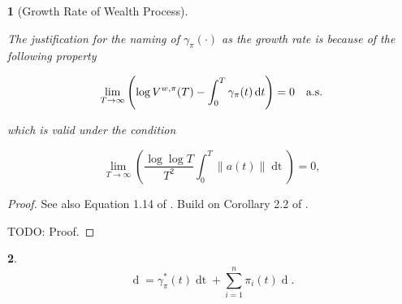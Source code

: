 \documentclass[british]{amsart} \usepackage{lmodern}
\numberwithin{equation}{section} \numberwithin{figure}{section}
\theoremstyle{plain} \newtheorem{thm}{\protect\theoremname}[section]
\theoremstyle{definition} \newtheorem{defn}[thm]{\protect\definitionname}
\theoremstyle{plain} \newtheorem{assumption}[thm]{\protect\assumptionname}
\theoremstyle{plain} \newtheorem{lem}[thm]{\protect\lemmaname}
\theoremstyle{plain} \newtheorem{prop}[thm]{\protect\propositionname}
\theoremstyle{remark} \newtheorem{rem}[thm]{\protect\remarkname}
\theoremstyle{plain} \newtheorem{cor}[thm]{\protect\corollaryname}
\renewcommand{\d}[1]{\mathop{\mathrm{d}{#1}}}
\newcommand{\norm}[1]{\left\lVert#1\right\rVert}
\begin{document}
\begin{prop} [Growth Rate of Wealth Process]
  \label{thm:wealthgrowthrate}

  The justification for the naming of $\gamma_{\pi}(\cdot)$ as the \textit{growth rate} is because of the following property

  \begin{equation*}
    \lim_{T \to \infty} 
      \left( 
      \log{V^{w,\pi}(T)} - \int_{0}^{T} \gamma_{\pi}(t)\d{t} 
      \right) = 0
    \quad \almostsurely
  \end{equation*}

  which is valid under the condition

  \begin{equation*}
    \lim_{T \to \infty}
      \left(
        \frac{\log \log T}{T^2} \int_{0}^{T} \norm{ a(t) } \d{t}
      \right) = 0,
  \end{equation*}

\end{prop}

\begin{proof}
  See also Equation 1.14 of \cite{fernholz2009}.
  Build on Corollary 2.2 of \cite{fernholz1999pgf}.

  TODO: Proof.
\end{proof}

\begin{prop}

  \begin{equation}
    \label{eq:logvalueprocess}
      \d{\log V^{\pi}(t)} = \gamma_{\pi}^{*}(t)\d{t} + \sum_{i=1}^{n} \pi_{i}(t) \d{\log{X_{i}(t)}}.
  \end{equation}

\end{prop}
\end{document}
